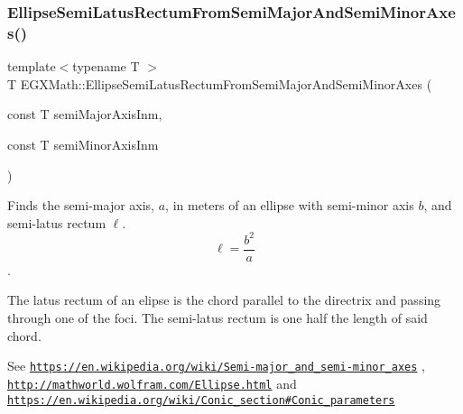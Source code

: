 \mbox{\label{group___e_g_x_math-_geometry-2_d-_ellipse-_semi_latus_rectum_ga8bb9235fdb20e3257489049022f4aeba}} 
\subsubsection{\texorpdfstring{Ellipse\+Semi\+Latus\+Rectum\+From\+Semi\+Major\+And\+Semi\+Minor\+Axes()}{EllipseSemiLatusRectumFromSemiMajorAndSemiMinorAxes()}}
{\footnotesize\ttfamily template$<$typename T $>$ \\
T E\+G\+X\+Math\+::\+Ellipse\+Semi\+Latus\+Rectum\+From\+Semi\+Major\+And\+Semi\+Minor\+Axes (\begin{DoxyParamCaption}\item[{const T}]{semi\+Major\+Axis\+Inm,  }\item[{const T}]{semi\+Minor\+Axis\+Inm }\end{DoxyParamCaption})}



Finds the semi-\/major axis, $a$, in meters of an ellipse with semi-\/minor axis $b$, and semi-\/latus rectum $\ell$. \[ \ell= \frac{b^2}{a} \]. 

The latus rectum of an elipse is the chord parallel to the directrix and passing through one of the foci. The semi-\/latus rectum is one half the length of said chord.

See \href{https://en.wikipedia.org/wiki/Semi-major_and_semi-minor_axes}{\tt https\+://en.\+wikipedia.\+org/wiki/\+Semi-\/major\+\_\+and\+\_\+semi-\/minor\+\_\+axes} , \href{http://mathworld.wolfram.com/Ellipse.html}{\tt http\+://mathworld.\+wolfram.\+com/\+Ellipse.\+html} and \href{https://en.wikipedia.org/wiki/Conic_section#Conic_parameters}{\tt https\+://en.\+wikipedia.\+org/wiki/\+Conic\+\_\+section\#\+Conic\+\_\+parameters}



